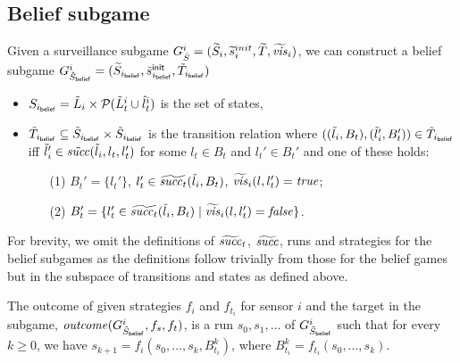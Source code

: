 \subsection{Belief subgame}
Given a surveillance subgame $G^{i}_{\hat{S}} = (\widetilde{S}_i,\widetilde{s}_i^{init},\widetilde{T},\widetilde{\mathit{vis}}_i)$, we can construct a belief subgame $G^{i}_{\tilde{S}_{\mathsf{belief}}} = (\widetilde{S}_{i_{\mathsf{belief}}},\tilde{s}^{\mathsf{init}}_{i_{\mathsf{belief}}},\tilde{T}_{i_{\mathsf{belief}}})$ 

\begin{itemize}
\item $S_{i_{\mathsf{belief}}} = \tilde{L}_i \times \mathcal{P}(\tilde{L}^i_t \cup \hat{l}_t^i)$ is the set of states,
\item $\tilde{T}_{i_{\mathsf{belief}}} \subseteq \tilde{S}_{i_{\mathsf{belief}}} \times \tilde{S}_{i_{\mathsf{belief}}}$ is the transition relation where $((\tilde{l}_i, B_t),(\tilde{l}_i', B_t')) \in \tilde{T}_{i_{\mathsf{belief}}}$ iff $\tilde{l}_i' \in  \tilde{\mathit{succ}}(\tilde{l}_i,l_t,l_t')$ for some $l_t \in B_t$ and $l_t' \in B_t'$ and one of these holds:
\begin{itemize}
\item[(1)] $B_t' = \{l_t'\}$, $l_t' \in \widetilde{\mathit{succ}_t}(\tilde{l}_i,B_t)$, $\widetilde{\mathit{vis}}_i(l,l_t') = \mathit{true}$;
\item[(2)] $B_t' = \{l_t' \in \widetilde{\mathit{succ}_t}(\tilde{l}_i,B_t)  \mid  \widetilde{\mathit{vis}}_i(l,l_t') = \mathit{false} \}$.
\end{itemize}
\end{itemize}

 For brevity, we omit the definitions of $\widetilde{\mathit{succ}}_t$, $\widetilde{\mathit{succ}}$, runs and strategies for the belief subgames as the definitions follow trivially from those for the belief games but in the subspace of transitions and states as defined above.

The outcome of given strategies $f_{i}$ and $f_{t_i}$ for sensor $i$ and the target in the subgame, $\mathit{outcome}(G^{i}_{\tilde{S}_{\mathsf{belief}}},f_s,f_t)$, is a run $s_0,s_1,\ldots$ of $G^{i}_{\tilde{S}_{\mathsf{belief}}}$ such that for every $k \geq 0$, we have $s_{k+1} = f_i(s_0,\ldots,s_k,B^k_{t_i})$, where $B^k_{t_i} = f_{t_i}(s_0,\ldots,s_k)$.

